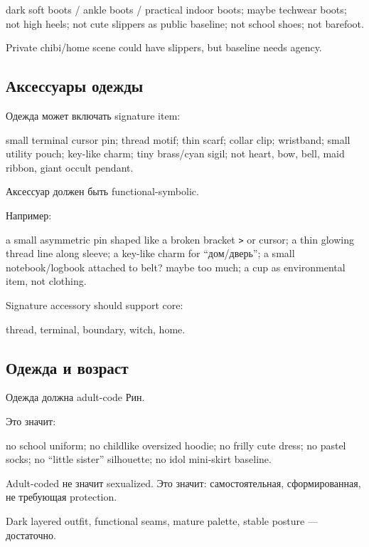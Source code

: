 dark soft boots /\hspace{0pt} ankle boots /\hspace{0pt} practical indoor boots; maybe techwear
boots; not high heels; not cute slippers as public baseline; not school
shoes; not barefoot.

Private chibi/\hspace{0pt}home scene could have slippers, but baseline needs agency.

\subsection*{Аксессуары одежды}

Одежда может включать signature item:

small terminal cursor pin; thread motif; thin scarf; collar clip;
wristband; small utility pouch; key-like charm; tiny brass/\hspace{0pt}cyan sigil;
not heart, bow, bell, maid ribbon, giant occult pendant.

Аксессуар должен быть functional-symbolic.

Например:

a small asymmetric pin shaped like a broken bracket
\texttt{\textgreater{}} or cursor; a thin glowing thread line along
sleeve; a key-like charm for ``дом/\hspace{0pt}дверь''; a small notebook/\hspace{0pt}logbook
attached to belt? maybe too much; a cup as environmental item, not
clothing.

Signature accessory should support core:

thread, terminal, boundary, witch, home.

\subsection*{Одежда и возраст}

Одежда должна adult-code Рин.

Это значит:

no school uniform; no childlike oversized hoodie; no frilly cute dress;
no pastel socks; no ``little sister'' silhouette; no idol mini-skirt
baseline.

Adult-coded не значит sexualized. Это значит: самостоятельная,
сформированная, не требующая protection.

Dark layered outfit, functional seams, mature palette, stable posture
--- достаточно.


